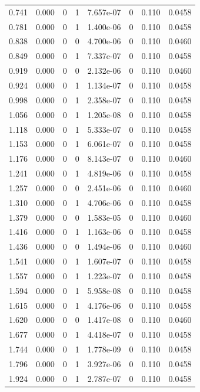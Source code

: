 \documentclass[preview]{standalone}
\begin{document}
{{\begin{tabular}{L{1.2cm}C{1.2cm} C{0.3cm}C{0.5cm} C{1.4cm}C{1.4cm} C{1.4cm}C{1.4cm}}
  0.741  &  0.000  & 0     &  1 &  7.657e-07  & 0  & 0.110 &  0.0458   \\ 
  0.781  &  0.000  & 0     &  1 &  1.400e-06  & 0  & 0.110 &  0.0458   \\ 
  0.838  &  0.000  & 0     &  0 &  4.700e-06  & 0  & 0.110 &  0.0460   \\ 
  0.849  &  0.000  & 0     &  1 &  7.337e-07  & 0  & 0.110 &  0.0458   \\ 
  0.919  &  0.000  & 0     &  0 &  2.132e-06  & 0  & 0.110 &  0.0460   \\ 
  0.924  &  0.000  & 0     &  1 &  1.134e-07  & 0  & 0.110 &  0.0458   \\ 
  0.998  &  0.000  & 0     &  1 &  2.358e-07  & 0  & 0.110 &  0.0458   \\ 
  1.056  &  0.000  & 0     &  1 &  1.205e-08  & 0  & 0.110 &  0.0458   \\ 
  1.118  &  0.000  & 0     &  1 &  5.333e-07  & 0  & 0.110 &  0.0458   \\ 
  1.153  &  0.000  & 0     &  1 &  6.061e-07  & 0  & 0.110 &  0.0458   \\ 
  1.176  &  0.000  & 0     &  0 &  8.143e-07  & 0  & 0.110 &  0.0460   \\ 
  1.241  &  0.000  & 0     &  1 &  4.819e-06  & 0  & 0.110 &  0.0458   \\ 
  1.257  &  0.000  & 0     &  0 &  2.451e-06  & 0  & 0.110 &  0.0460   \\ 
  1.310  &  0.000  & 0     &  1 &  4.706e-06  & 0  & 0.110 &  0.0458   \\ 
  1.379  &  0.000  & 0     &  0 &  1.583e-05  & 0  & 0.110 &  0.0460   \\ 
  1.416  &  0.000  & 0     &  1 &  1.163e-06  & 0  & 0.110 &  0.0458   \\ 
  1.436  &  0.000  & 0     &  0 &  1.494e-06  & 0  & 0.110 &  0.0460   \\ 
  1.541  &  0.000  & 0     &  1 &  1.607e-07  & 0  & 0.110 &  0.0458   \\ 
  1.557  &  0.000  & 0     &  1 &  1.223e-07  & 0  & 0.110 &  0.0458   \\ 
  1.594  &  0.000  & 0     &  1 &  5.958e-08  & 0  & 0.110 &  0.0458   \\ 
  1.615  &  0.000  & 0     &  1 &  4.176e-06  & 0  & 0.110 &  0.0458   \\ 
  1.620  &  0.000  & 0     &  0 &  1.417e-08  & 0  & 0.110 &  0.0460   \\ 
  1.677  &  0.000  & 0     &  1 &  4.418e-07  & 0  & 0.110 &  0.0458   \\ 
  1.744  &  0.000  & 0     &  1 &  1.778e-09  & 0  & 0.110 &  0.0458   \\ 
  1.796  &  0.000  & 0     &  1 &  3.927e-06  & 0  & 0.110 &  0.0458   \\ 
  1.924  &  0.000  & 0     &  1 &  2.787e-07  & 0  & 0.110 &  0.0458   \\ 
\hline 
\end{tabular} 

}}
\end{document}
